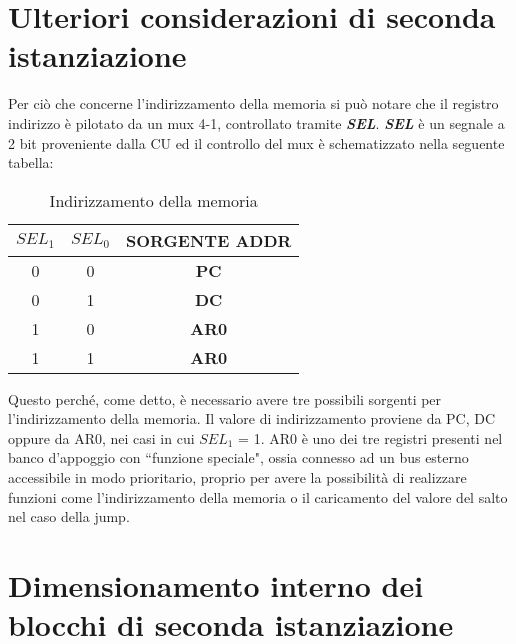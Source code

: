 \section{Ulteriori considerazioni di seconda istanziazione}
Per ciò che concerne l'indirizzamento della memoria si può notare che il registro indirizzo è pilotato da un mux 4-1, controllato tramite \textit{\textbf{SEL}}. \textit{\textbf{SEL}} è un segnale a 2 bit proveniente dalla CU ed il controllo del mux è schematizzato nella seguente tabella:
\begin{table}[H]
	\centering
	\footnotesize
	\fontsize{10}{18}\selectfont
	\begin{tabular}{|p{1.5cm}|p{1.5cm}|p{2.5cm}|}
		\hline
		\multicolumn{1}{|c|}{\textit{$SEL_1$}} &
		\multicolumn{1}{c|}{\textit{$SEL_0$}} & 
		\multicolumn{1}{c|}{SORGENTE ADDR}\\
		
		\hline
		\multicolumn{1}{|c|}{0} &
		\multicolumn{1}{c|}{0} & 
		\multicolumn{1}{c|}{\textbf{PC}}\\
		
		\hline
		\multicolumn{1}{|c|}{0} &
		\multicolumn{1}{c|}{1} & 
		\multicolumn{1}{c|}{\textbf{DC}}\\
		
		\hline
		\multicolumn{1}{|c|}{1} &
		\multicolumn{1}{c|}{0} & 
		\multicolumn{1}{c|}{\textbf{AR0}}\\
		
		\hline
		\multicolumn{1}{|c|}{1} &
		\multicolumn{1}{c|}{1} & 
		\multicolumn{1}{c|}{\textbf{AR0}}\\ \hline
	\end{tabular}
	\caption{Indirizzamento della memoria}
	\label{2_tabella_SEL}
\end{table}
\noindent
Questo perché, come detto, è necessario avere tre possibili sorgenti per l'indirizzamento della memoria. Il valore di indirizzamento proviene da PC, DC oppure da AR0, nei casi in cui $SEL_1$ = 1. AR0 è uno dei tre registri presenti nel banco d'appoggio con \textquotedblleft funzione speciale", ossia connesso ad un bus esterno accessibile in modo prioritario, proprio per avere la possibilità di realizzare funzioni come l'indirizzamento della memoria o il caricamento del valore del salto nel caso della jump.

\section{Dimensionamento interno dei blocchi di seconda istanziazione}
